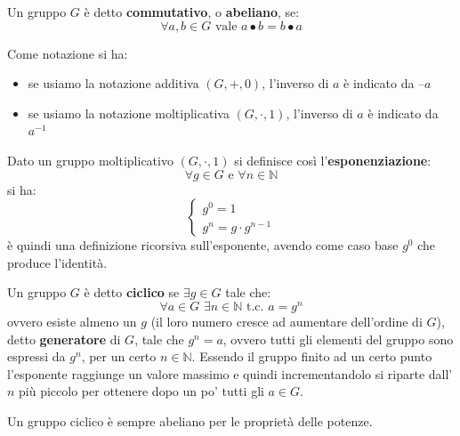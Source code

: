 \documentclass[a4paper,12pt, oneside]{book}
\begin{document}
\begin{definizione}
  Un gruppo $G$ è detto \textbf{commutativo}, o \textbf{abeliano}, se:
  \[\forall a,b\in G \mbox{ vale }a\bullet b= b\bullet a\]
\end{definizione}
Come notazione si ha:
\begin{itemize}
  \item se usiamo la notazione additiva $(G, +, 0)$, l'inverso di $a$ è
  indicato da $–a$  
  \item se usiamo la notazione moltiplicativa $(G, \cdot, 1)$, l'inverso di
  $a$ è indicato da $a^{-1}$ 
\end{itemize}
\begin{definizione}
  Dato un gruppo moltiplicativo $(G, \cdot, 1)$ si definisce così
  l'\textbf{esponenziazione}:
  \[\forall g\in G\mbox{ e }\forall n\in \mathbb{N}\]
  si ha:
  \[
    \begin{cases}
      g^0=1\\
      g^n=g\cdot g^{n-1}
    \end{cases}
  \]
  è quindi una definizione ricorsiva sull'esponente, avendo come caso base
  $g^0$ che produce l'identità.
\end{definizione}
\begin{definizione}
  Un gruppo $G$ è detto \textbf{ciclico} se $\exists g\in G$ tale che:
  \[\forall a \in G \,\,\exists n\in \mathbb{N}\mbox{ t.c. }a=g^n\]
  ovvero esiste almeno un $g$ (il loro numero cresce ad aumentare dell'ordine
  di $G$), detto \textbf{generatore} di $G$, tale che $g^n=a$, ovvero tutti
  gli elementi del gruppo sono espressi da $g^n$, per un certo
  $n\in\mathbb{N}$. Essendo il gruppo finito ad un certo punto l'esponente
  raggiunge un valore massimo e quindi incrementandolo si riparte dall'$n$ più
  piccolo per ottenere dopo un po' tutti gli $a\in G$.
\end{definizione}
\begin{teorema}
  Un gruppo ciclico è sempre abeliano per le proprietà delle potenze.
\end{teorema}
\end{document}
